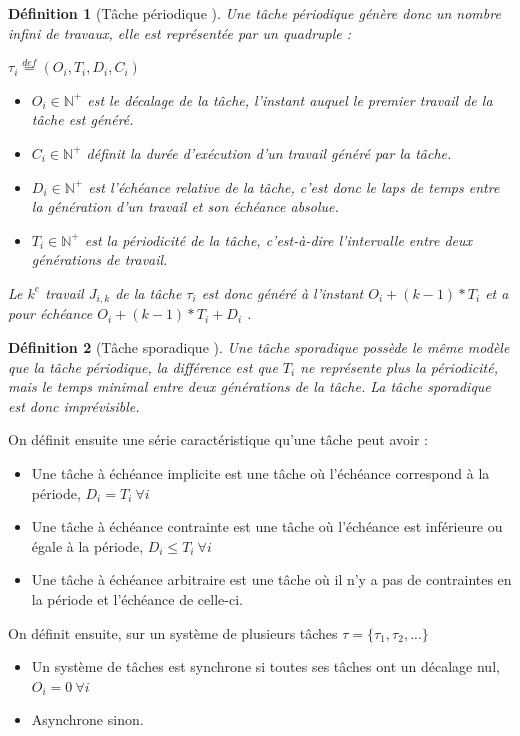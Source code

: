 \documentclass[12pt,a4paper,oneside]{book}
\theoremstyle{break}
\newtheorem{defin}{Définition}[chapter]
\theoremstyle{breakplain}
\begin{document}
\begin{defin}[Tâche périodique \cite{goossens1999scheduling}]
Une tâche périodique génère donc un nombre infini de travaux, elle est représentée par un quadruple :
\begin{center}
$\tau_i \overset{def}{=} (O_i, T_i, D_i, C_i)$
\end{center}
\begin{itemize}
\item $O_i \in \mathbb{N}^{+}$ est le décalage de la tâche, l'instant auquel le premier travail de la tâche est généré.
\item $C_i \in \mathbb{N}^{+}$ définit la durée d'exécution d'un travail généré par la tâche.
\item $D_i \in \mathbb{N}^{+}$ est l'échéance relative de la tâche, c'est donc le laps de temps entre la génération d'un travail et son échéance absolue.
\item $T_i \in \mathbb{N}^{+}$ est la périodicité de la tâche, c'est-à-dire l'intervalle entre deux générations de travail.\\
\end{itemize}
Le $k^{e}$ travail $J_{i,k}$ de la tâche $\tau_i$ est donc généré à l'instant $O_i + (k-1)*T_i$ et a pour échéance  $O_i+(k-1)*T_i+D_i$ .
\end{defin}

\begin{defin}[Tâche sporadique \cite{goossens1999scheduling}]
Une tâche sporadique possède le même modèle que la tâche périodique, la différence est que $T_i$ ne représente plus la périodicité, mais le temps minimal entre deux générations de la tâche. La tâche sporadique est donc imprévisible.
\end{defin}

On définit ensuite une série caractéristique \cite{goossens1999scheduling} qu'une tâche peut avoir :
\begin{itemize}
\item Une tâche à échéance implicite est une tâche où l'échéance correspond à la période, $D_i = T_i\ \forall i$
\item Une tâche à échéance contrainte est une tâche où l'échéance est inférieure ou égale à la période, $D_i \le T_i\ \forall i$
\item Une tâche à échéance arbitraire est une tâche où il n'y a pas de contraintes en la période et l'échéance de celle-ci.
\end{itemize}
On définit ensuite, sur un système de plusieurs tâches $\tau = \{\tau_1, \tau_2, ...\}$
\begin{itemize}
\item Un système de tâches est synchrone si toutes ses tâches ont un décalage nul, $O_i = 0\ \forall i$
\item Asynchrone sinon.
\end{itemize}
\end{document}
